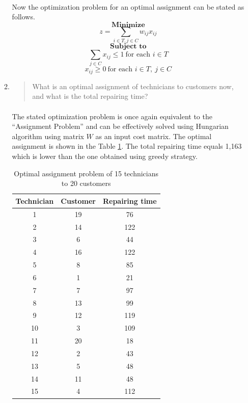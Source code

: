 \begin{enumerate}[(a)]
\begin{enumerate}[1.]
	\paragraph{}
	Now the optimization problem for an optimal assignment can be stated as follows.
$$
	\textbf{Minimize}
$$
$$
	z = \sum\limits_{i\in T, j\in C} w_{ij}x_{ij}
$$
$$
	\textbf{Subject to}
$$
$$
	\sum\limits_{j\in C} x_{ij} \leq 1 \ \text{for each }i\in T
$$
$$
	x_{ij} \geq 0 \ \text{for each }i\in T,\  j\in C
$$

\item\begin{quote}What is an optimal assignment of technicians to customers now, and what is
the total repairing time?\end{quote}

	\paragraph{}
	The stated optimization problem is once again equivalent to the ``Assignment Problem'' and can be effectively solved using Hungarian algorithm using matrix $W$ as an input cost matrix. The optimal assignment is shown in the Table \ref{hungarian-1-b}. The total repairing time equals 1,163 which is lower than the one obtained using greedy strategy.

\begin{table}[H]
	\centering
	\caption{Optimal assignment problem of 15 technicians to 20 customers}
	\begin{tabular}{|c|c|c|}\hline
Technician & Customer & Repairing time \\ \hline
1 & 19 & 76 \\
2 & 14 & 122 \\
3 & 6 & 44 \\
4 & 16 & 122 \\
5 & 8 & 85 \\
6 & 1 & 21 \\
7 & 7 & 97 \\
8 & 13 & 99 \\
9 & 12 & 119 \\
10 & 3 & 109 \\
11 & 20 & 18 \\
12 & 2 & 43 \\
13 & 5 & 48 \\
14 & 11 & 48 \\
15 & 4 & 112 \\
\hline
	\end{tabular}
	\label{hungarian-1-b}
\end{table}


\end{enumerate}
\end{enumerate}
